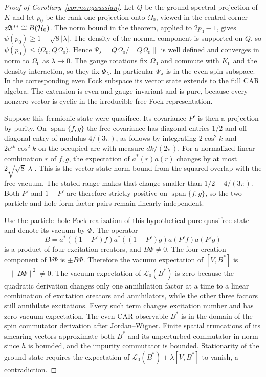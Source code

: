 \begin{proof}[Proof of Corollary~\ref{cor:nongaussian}]
Let $Q$ be the ground spectral projection of $K$ and let $p_0$ be the
rank-one projection onto $\Omega_0$, viewed in the central corner
$z\mathfrak A^{**}\cong B(\mathcal H_0)$. The norm bound in the theorem, applied to
$2p_0-1$, gives $\psi(p_0)\geq1-\sqrt8|\lambda|$. The density of the normal
component is supported on $Q$, so $\psi(p_0)\leq\langle\Omega_0,Q\Omega_0\rangle$.
Hence $\Psi_\lambda=Q\Omega_0/\|Q\Omega_0\|$ is well defined and converges
in norm to $\Omega_0$ as $\lambda\to0$. The gauge rotations fix $\Omega_0$
and commute with $K_0$ and the density interaction, so they fix
$\Psi_\lambda$. In particular $\Psi_\lambda$ is in the even spin subspace.
In the corresponding even Fock subspace its vector state extends to the
full CAR algebra. The extension is even and gauge invariant and is pure,
because every nonzero vector is cyclic in the irreducible free Fock
representation.

Suppose this fermionic state were quasifree. Its covariance $P'$ is then a
projection by purity. On $\operatorname{span}\{f,g\}$ the free covariance
has diagonal entries $1/2$ and off-diagonal entry of modulus $4/(3\pi)$,
as follows by integrating $2\cos^2 k$ and $2e^{ik}\cos^2 k$ on the occupied
arc with measure $dk/(2\pi)$. For a normalized linear combination $r$ of
$f,g$, the expectation of $a^*(r)a(r)$ changes by at most
$2\sqrt{\sqrt8|\lambda|}$. This is the vector-state norm bound from the
squared overlap with the free vacuum. The stated range makes that change
smaller than $1/2-4/(3\pi)$. Both $P'$ and $1-P'$ are therefore strictly
positive on $\operatorname{span}\{f,g\}$, so the two particle and hole
form-factor pairs remain linearly independent.

Use the particle--hole Fock realization of this hypothetical pure
quasifree state and denote its vacuum by $\Phi$. The operator
\[
 B=a^*((1-P')f)a^*((1-P')g)a(P'f)a(P'g)
\]
is a product of four excitation creators, and $B\Phi\ne0$. The four-creation
component of $V\Phi$ is $\pm B\Phi$. Therefore the vacuum expectation of
$[V,B^*]$ is $\mp\|B\Phi\|^2\ne0$. The vacuum expectation of
$\mathcal L_0(B^*)$ is zero because the quadratic derivation changes only one
annihilation factor at a time to a linear combination of excitation
creators and annihilators, while the other three factors still annihilate
excitations. Every such term changes excitation number and has zero vacuum
expectation. The even CAR observable $B^*$ is in the domain of the spin
commutator derivation after Jordan--Wigner. Finite spatial truncations of
its smearing vectors approximate both $B^*$ and its unperturbed commutator
in norm since $h$ is bounded, and the impurity commutator is bounded.
Stationarity of the ground state requires the expectation of
$\mathcal L_0(B^*)+\lambda[V,B^*]$ to vanish, a contradiction.
\end{proof}

